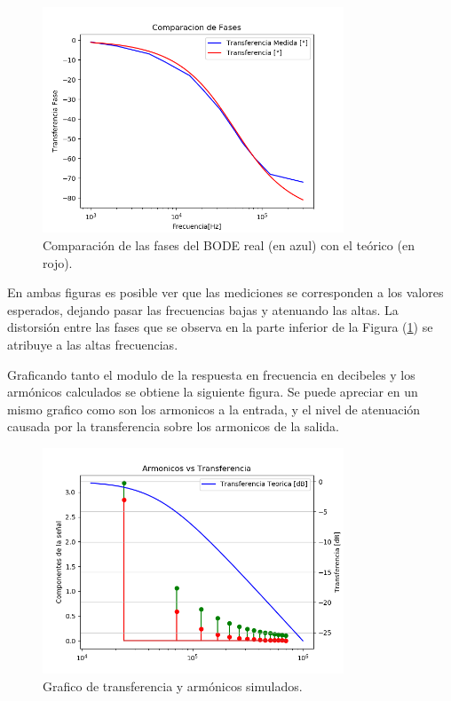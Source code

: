 \documentclass[a4paper]{article}
\begin{document}
\begin{figure}[H]
	\centering
	\includegraphics[width=0.8\textwidth]{FaseRealVsMedido}
\caption{Comparación de las fases del BODE real (en azul) con el teórico (en rojo).}
	\label{fig:fasecomparacion}
\end{figure}

En ambas figuras es posible ver que las mediciones se corresponden a los valores esperados, dejando pasar las frecuencias bajas y atenuando las altas. La distorsión entre las fases que se observa en la parte inferior de la Figura (\ref{fig:fasecomparacion}) se atribuye a las altas frecuencias. 

Graficando tanto el modulo de la respuesta en frecuencia en decibeles y los armónicos calculados se obtiene la siguiente figura. Se puede apreciar en un  mismo grafico como son los armonicos a la entrada, y el nivel de atenuación causada por la transferencia sobre los armonicos de la salida.  

\begin{figure}[H]
	\centering
	\includegraphics[width=0.8\textwidth]{ArmonicosVsTransferencia}
\caption{Grafico de transferencia y armónicos simulados.}
	\label{fig:aromincosvstransf}
\end{figure}
\end{document}
